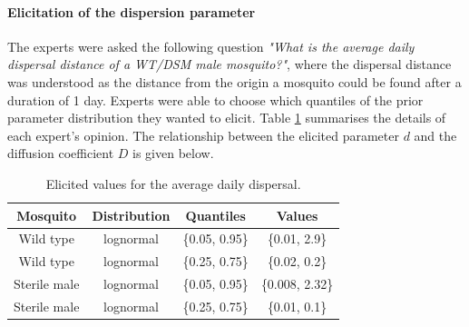 \documentclass[]{bmcart}
\begin{document}
\begin{backmatter}
\paragraph{Elicitation of the dispersion parameter}
The experts  were asked the following question \emph{"What is the average daily dispersal distance of a WT/DSM male mosquito?"}, where the dispersal distance was understood as the distance from the origin a mosquito could be found after a duration of 1 day. Experts were able to choose which quantiles of the prior parameter distribution they wanted to elicit. Table \ref{tble:elicit_disp} summarises the details of each expert's opinion. The relationship between the elicited parameter $d$ and the diffusion coefficient $D$ is given below.
\begin{table}[h]
\centering
\begin{tabular}{|c|ccc|}
\hline
Mosquito & Distribution & Quantiles & Values  \\\hline
Wild type & lognormal & \{0.05, 0.95\} & \{0.01, 2.9\}\\
Wild type & lognormal & \{0.25, 0.75\} & \{0.02, 0.2\}\\
Sterile male & lognormal & \{0.05, 0.95\} & \{0.008, 2.32\}\\
Sterile male & lognormal & \{0.25, 0.75\} & \{0.01, 0.1\}\\
\hline
\end{tabular}
\caption{\label{tble:elicit_disp} Elicited values for the average daily dispersal. }
\end{table}



\end{backmatter}
\end{document}

